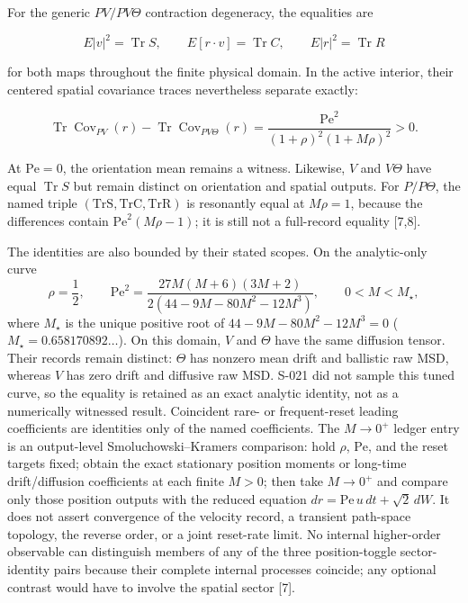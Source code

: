 For the generic \(PV/PV\Theta\) contraction degeneracy, the equalities are

\[
E|v|^2=\operatorname{Tr}S,\qquad
E[r\mathbin{\cdot}v]=\operatorname{Tr}C,\qquad
E|r|^2=\operatorname{Tr}R
\]

for both maps throughout the finite physical domain. In the active interior, their centered spatial covariance traces nevertheless separate exactly:

\[
\operatorname{Tr}\operatorname{Cov}_{PV}(r)-
\operatorname{Tr}\operatorname{Cov}_{PV\Theta}(r)=
\frac{\mathrm{Pe}^2}{(1+\rho)^2(1+M\rho)^2}>0.
\]

At \(\mathrm{Pe}=0\), the orientation mean remains a witness. Likewise, \(V\) and \(V\Theta\) have equal \(\operatorname{Tr}S\) but remain distinct on orientation and spatial outputs. For \(P/P\Theta\), the named triple \((\mathrm{TrS},\mathrm{TrC},\mathrm{TrR})\) is resonantly equal at \(M\rho=1\), because the differences contain \(\mathrm{Pe}^2(M\rho-1)\); it is still not a full-record equality {[}7,8{]}.

The identities are also bounded by their stated scopes. On the analytic-only curve \[
\rho=\frac12,\qquad
\mathrm{Pe}^2=
\frac{27M(M+6)(3M+2)}
{2(44-9M-80M^2-12M^3)},\qquad
0<M<M_\star ,
\] where \(M_\star\) is the unique positive root of \(44-9M-80M^2-12M^3=0\) (\(M_\star=0.658170892\ldots\)). On this domain, \(V\) and \(\Theta\) have the same diffusion tensor. Their records remain distinct: \(\Theta\) has nonzero mean drift and ballistic raw MSD, whereas \(V\) has zero drift and diffusive raw MSD. S-021 did not sample this tuned curve, so the equality is retained as an exact analytic identity, not as a numerically witnessed result. Coincident rare- or frequent-reset leading coefficients are identities only of the named coefficients. The \(M\to0^+\) ledger entry is an output-level Smoluchowski--Kramers comparison: hold \(\rho\), \(\mathrm{Pe}\), and the reset targets fixed; obtain the exact stationary position moments or long-time drift/diffusion coefficients at each finite \(M>0\); then take \(M\to0^+\) and compare only those position outputs with the reduced equation \(dr=\mathrm{Pe}\,u\,dt+\sqrt2\,dW\). It does not assert convergence of the velocity record, a transient path-space topology, the reverse order, or a joint reset-rate limit. No internal higher-order observable can distinguish members of any of the three position-toggle sector-identity pairs because their complete internal processes coincide; any optional contrast would have to involve the spatial sector {[}7{]}.

